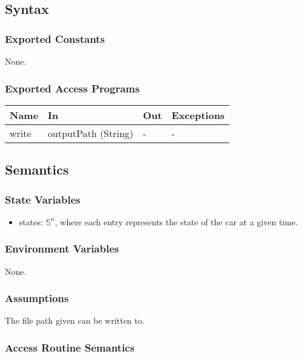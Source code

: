 \documentclass[12pt, titlepage]{article}
\begin{document}
\subsection{Syntax}

\subsubsection{Exported Constants}
None.

\subsubsection{Exported Access Programs}

\begin{center}
\begin{tabular}{p{2cm} p{4cm} p{4cm} p{2cm}}
\hline
\textbf{Name} & \textbf{In} & \textbf{Out} & \textbf{Exceptions} \\
\hline
write & outputPath (String) & - & - \\
\hline
\end{tabular}
\end{center}

\subsection{Semantics}

\subsubsection{State Variables}

\begin{itemize}
  \item states: $\mathbb{S}^n$, where each entry represents the state of the car at a given time.
\end{itemize}

\subsubsection{Environment Variables}

None.

\subsubsection{Assumptions}

The file path given can be written to.

\subsubsection{Access Routine Semantics}
\end{document}
